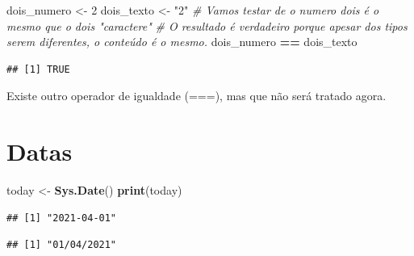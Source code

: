 \documentclass[
]{book}
\newenvironment{Shaded}{\begin{snugshade}}{\end{snugshade}}
\newcommand{\CommentTok}[1]{\textcolor[rgb]{0.56,0.35,0.01}{\textit{#1}}}
\newcommand{\DecValTok}[1]{\textcolor[rgb]{0.00,0.00,0.81}{#1}}
\newcommand{\KeywordTok}[1]{\textcolor[rgb]{0.13,0.29,0.53}{\textbf{#1}}}
\newcommand{\NormalTok}[1]{#1}
\newcommand{\OperatorTok}[1]{\textcolor[rgb]{0.81,0.36,0.00}{\textbf{#1}}}
\newcommand{\StringTok}[1]{\textcolor[rgb]{0.31,0.60,0.02}{#1}}
\begin{document}
\begin{Shaded}
\begin{Highlighting}[]
\NormalTok{dois_numero <-}\StringTok{ }\DecValTok{2}
\NormalTok{dois_texto <-}\StringTok{ "2"}
\CommentTok{# Vamos testar de o numero dois é o mesmo que o dois "caractere"}
\CommentTok{# O resultado é verdadeiro porque apesar dos tipos serem diferentes, o conteúdo é o mesmo.}
\NormalTok{dois_numero }\OperatorTok{==}\StringTok{ }\NormalTok{dois_texto}
\end{Highlighting}
\end{Shaded}

\begin{verbatim}
## [1] TRUE
\end{verbatim}

Existe outro operador de igualdade (===), mas que não será tratado agora.

\hypertarget{datas}{%
\section{Datas}\label{datas}}

\begin{Shaded}
\begin{Highlighting}[]
\NormalTok{today <-}\StringTok{ }\KeywordTok{Sys.Date}\NormalTok{()}
\KeywordTok{print}\NormalTok{(today)}
\end{Highlighting}
\end{Shaded}

\begin{verbatim}
## [1] "2021-04-01"
\end{verbatim}

\begin{Shaded}
\end{Shaded}

\begin{verbatim}
## [1] "01/04/2021"
\end{verbatim}

\begin{Shaded}
\end{Shaded}
\end{document}
